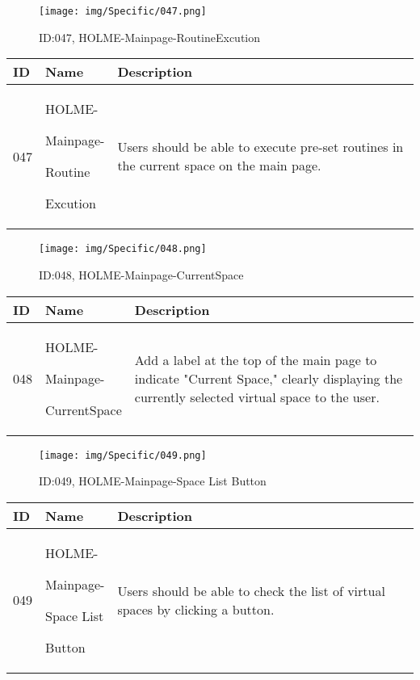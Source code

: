 \documentclass[conference]{IEEEtran}
\begin{document}
\begin{enumerate}
\begin{figure}[h]
\centering
\texttt{[image: img/Specific/047.png]}
\caption{ID:047, HOLME-Mainpage-RoutineExcution}
\end{figure}
\begin{table}[h]
\def\arraystretch{1.2} \small
    \begin{tabular}{|p{1cm}|p{1.8cm}|p{5.0cm}|}
        \hline
        ID & Name & Description\\ \hline
         047 \par  & HOLME-\par Mainpage-\par Routine \par Excution &Users should be able to execute pre-set routines in the current space on the main page.\\ \hline
    \end{tabular}
\end{table}

\begin{figure}[h]
\centering
\texttt{[image: img/Specific/048.png]}
\caption{ID:048, HOLME-Mainpage-CurrentSpace}
\end{figure}
\begin{table}[h]
\def\arraystretch{1.2} \small
    \begin{tabular}{|p{1cm}|p{1.8cm}|p{5.0cm}|}
        \hline
        ID & Name & Description\\ \hline
         048 \par  & HOLME-\par Mainpage-\par CurrentSpace &Add a label at the top of the main page to indicate "Current Space," clearly displaying the currently selected virtual space to the user.\\ \hline
    \end{tabular}
\end{table}

\begin{figure}[h]
\centering
\texttt{[image: img/Specific/049.png]}
\caption{ID:049, HOLME-Mainpage-Space List Button}
\end{figure}
\begin{table}[h]
\def\arraystretch{1.2} \small
    \begin{tabular}{|p{1cm}|p{1.8cm}|p{5.0cm}|}
        \hline
        ID & Name & Description\\ \hline
         049 \par  & HOLME-\par Mainpage-\par Space List \par Button &Users should be able to check the list of virtual spaces by clicking a button.\\ \hline
    \end{tabular}
\end{table}
\clearpage


\end{enumerate}
\end{document}
